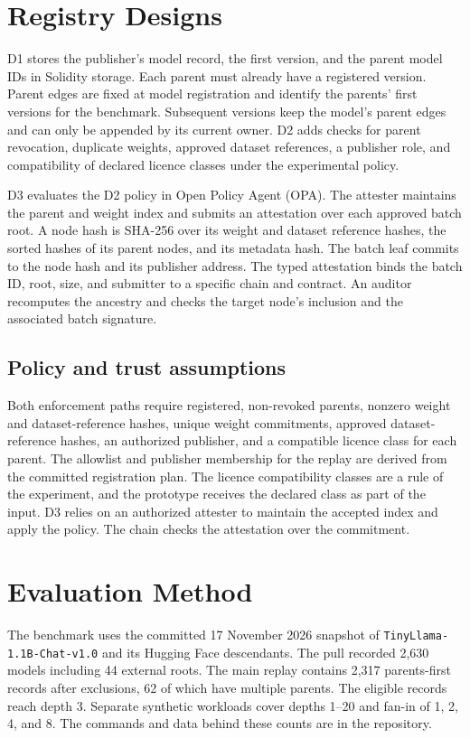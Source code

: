 \documentclass[conference]{IEEEtran}
\begin{document}
\section{Registry Designs}
D1 stores the publisher's model record, the first version, and the parent
model IDs in Solidity storage. Each parent must already have a registered
version. Parent edges are fixed at model registration and identify the
parents' first versions for the benchmark. Subsequent versions keep the
model's parent edges and can only be appended by its current owner. D2
adds checks for parent revocation, duplicate weights, approved dataset
references, a publisher role, and compatibility of declared licence
classes under the experimental policy.

D3 evaluates the D2 policy in Open Policy Agent (OPA). The attester
maintains the parent and weight index and submits an attestation over each
approved batch root. A node hash is SHA-256 over its weight and dataset
reference hashes, the sorted hashes of its parent nodes, and its metadata
hash. The batch leaf commits to the node hash and its publisher address.
The typed attestation binds the batch ID, root, size, and submitter to a
specific chain and contract. An auditor recomputes the ancestry and
checks the target node's inclusion and the associated batch signature.

\subsection{Policy and trust assumptions}
Both enforcement paths require registered, non-revoked parents, nonzero
weight and dataset-reference hashes, unique weight commitments, approved
dataset-reference hashes, an authorized publisher, and a compatible
licence class for each parent. The allowlist and publisher membership
for the replay are derived from the committed registration plan. The
licence compatibility classes are a rule of the experiment, and the
prototype receives the declared class as part of the input. D3 relies
on an authorized attester to maintain the accepted index and apply the
policy. The chain checks the attestation over the commitment.

\section{Evaluation Method}
The benchmark uses the committed 17 November 2026 snapshot of
\texttt{TinyLlama-1.1B-Chat-v1.0} and its Hugging Face descendants.
The pull recorded 2,630 models including 44 external roots. The main
replay contains 2,317 parents-first records after exclusions, 62 of which
have multiple parents. The eligible records reach depth 3. Separate
synthetic workloads cover depths 1--20 and fan-in of 1, 2, 4, and 8.
The commands and data behind these counts are in the repository.
\end{document}
